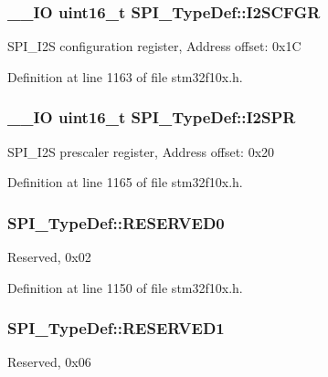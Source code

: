\hypertarget{struct_s_p_i___type_def_a20a4775ce461eec0d9a437bed464c0a5}{
\subsubsection[{I2\-S\-C\-F\-G\-R}]{\setlength{\rightskip}{0pt plus 5cm}\-\_\-\-\_\-\-I\-O {\bf uint16\-\_\-t} S\-P\-I\-\_\-\-Type\-Def\-::\-I2\-S\-C\-F\-G\-R}}\label{struct_s_p_i___type_def_a20a4775ce461eec0d9a437bed464c0a5}
S\-P\-I\-\_\-\-I2\-S configuration register, Address offset\-: 0x1\-C 

Definition at line 1163 of file stm32f10x.\-h.

\hypertarget{struct_s_p_i___type_def_aecee11b0d2e534b5243e9db6a0e10026}{
\subsubsection[{I2\-S\-P\-R}]{\setlength{\rightskip}{0pt plus 5cm}\-\_\-\-\_\-\-I\-O {\bf uint16\-\_\-t} S\-P\-I\-\_\-\-Type\-Def\-::\-I2\-S\-P\-R}}\label{struct_s_p_i___type_def_aecee11b0d2e534b5243e9db6a0e10026}
S\-P\-I\-\_\-\-I2\-S prescaler register, Address offset\-: 0x20 

Definition at line 1165 of file stm32f10x.\-h.

\hypertarget{struct_s_p_i___type_def_a7f16c40933b8a713085436be72d30a46}{
\subsubsection[{R\-E\-S\-E\-R\-V\-E\-D0}]{ S\-P\-I\-\_\-\-Type\-Def\-::\-R\-E\-S\-E\-R\-V\-E\-D0}}\label{struct_s_p_i___type_def_a7f16c40933b8a713085436be72d30a46}
Reserved, 0x02 

Definition at line 1150 of file stm32f10x.\-h.

\hypertarget{struct_s_p_i___type_def_a1b7a800c0f56532a431b19cf868e4102}{
\subsubsection[{R\-E\-S\-E\-R\-V\-E\-D1}]{ S\-P\-I\-\_\-\-Type\-Def\-::\-R\-E\-S\-E\-R\-V\-E\-D1}}\label{struct_s_p_i___type_def_a1b7a800c0f56532a431b19cf868e4102}
Reserved, 0x06 

